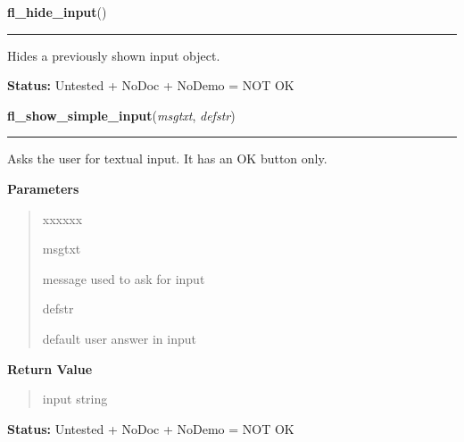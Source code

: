 \hspace{.8\funcindent}\begin{boxedminipage}{\funcwidth}

    \raggedright \textbf{fl\_hide\_input}()

    \vspace{-1.5ex}

    \rule{\textwidth}{0.5\fboxrule}
\setlength{\parskip}{2ex}
    Hides a previously shown input object.

\setlength{\parskip}{1ex}
\textbf{Status:} Untested + NoDoc + NoDemo = NOT OK



    \end{boxedminipage}

    \label{xformslib:library:fl_show_simple_input}

    \vspace{0.5ex}

\hspace{.8\funcindent}\begin{boxedminipage}{\funcwidth}

    \raggedright \textbf{fl\_show\_simple\_input}(\textit{msgtxt}, \textit{defstr})

    \vspace{-1.5ex}

    \rule{\textwidth}{0.5\fboxrule}
\setlength{\parskip}{2ex}
    Asks the user for textual input. It has an OK button only.

\setlength{\parskip}{1ex}
      \textbf{Parameters}
      \vspace{-1ex}

      \begin{quote}
        \begin{Ventry}{xxxxxx}

          \item[msgtxt]

          message used to ask for input

          \item[defstr]

          default user answer in input

        \end{Ventry}

      \end{quote}

      \textbf{Return Value}
    \vspace{-1ex}

      \begin{quote}
      input string

      \end{quote}

\textbf{Status:} Untested + NoDoc + NoDemo = NOT OK



    \end{boxedminipage}

